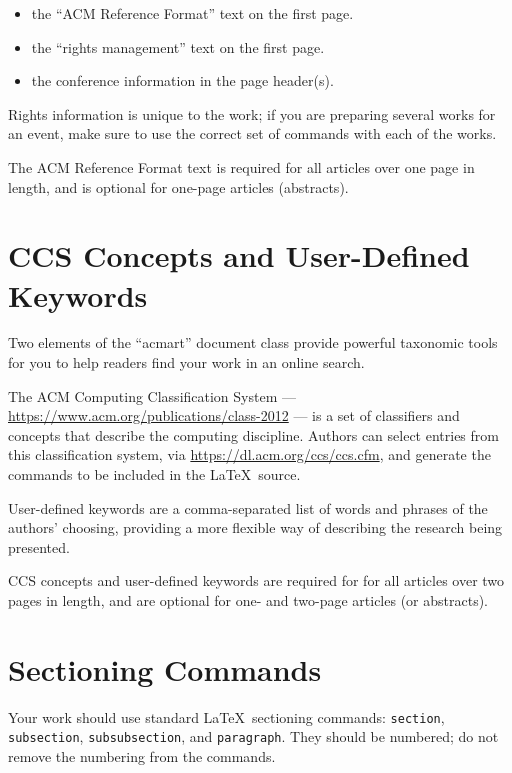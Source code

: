 \documentclass[
acmsmall,
nonacm,
screen,
acmthm]{../templates/acmart}
\begin{document}
\begin{itemize}
\item
  the ``ACM Reference Format'' text on the first page.
\item
  the ``rights management'' text on the first page.
\item
  the conference information in the page header(s).
\end{itemize}

Rights information is unique to the work; if you are preparing several
works for an event, make sure to use the correct set of commands with
each of the works.

The ACM Reference Format text is required for all articles over one page
in length, and is optional for one-page articles (abstracts).

\hypertarget{ccs-concepts-and-user-defined-keywords}{%
\section{CCS Concepts and User-Defined
Keywords}\label{ccs-concepts-and-user-defined-keywords}}

Two elements of the ``acmart'' document class provide powerful taxonomic
tools for you to help readers find your work in an online search.

The ACM Computing Classification System ---
\url{https://www.acm.org/publications/class-2012} --- is a set of
classifiers and concepts that describe the computing discipline. Authors
can select entries from this classification system, via
\url{https://dl.acm.org/ccs/ccs.cfm}, and generate the commands to be
included in the LaTeX~source.

User-defined keywords are a comma-separated list of words and phrases of
the authors' choosing, providing a more flexible way of describing the
research being presented.

CCS concepts and user-defined keywords are required for for all articles
over two pages in length, and are optional for one- and two-page
articles (or abstracts).

\hypertarget{sectioning-commands}{%
\section{Sectioning Commands}\label{sectioning-commands}}

Your work should use standard LaTeX~sectioning commands:
\texttt{section}, \texttt{subsection}, \texttt{subsubsection}, and
\texttt{paragraph}. They should be numbered; do not remove the numbering
from the commands.
\end{document}
